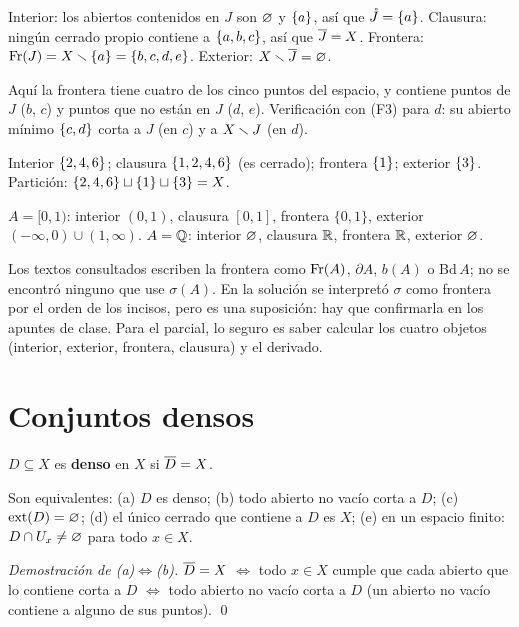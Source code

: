 \begin{ejemplo}[Ejemplo: $J=\s{a,b,c}$ en $\tau_1$ (Parte I, incisos g y h)]
Interior: los abiertos contenidos en $J$ son $\varnothing$ y $\{a\}$, así que $\mathring{J}=\{a\}$. Clausura: ningún cerrado
propio contiene a $\{a,b,c\}$, así que $\overline{J}=X$. Frontera: $\operatorname{Fr}(J)=X\smallsetminus\{a\}=\{b,c,d,e\}$. Exterior:
$X\smallsetminus\overline{J}=\varnothing$.

Aquí la frontera tiene cuatro de los cinco puntos del espacio, y contiene puntos de $J$ ($b$, $c$) y puntos que no
están en $J$ ($d$, $e$). Verificación con (F3) para $d$: su abierto mínimo $\{c,d\}$ corta a $J$ (en $c$) y a
$X\smallsetminus J$ (en $d$).
\end{ejemplo}
\begin{ejemplo}[Ejemplo: $L\cup M=\s{1,2,4,6}$ en $\tau_2$ (Parte II, inciso g)]
Interior $\{2,4,6\}$; clausura $\{1,2,4,6\}$ (es cerrado); frontera $\{1\}$; exterior $\{3\}$. Partición:
$\{2,4,6\}\sqcup\{1\}\sqcup\{3\}=X$.
\end{ejemplo}
\begin{ejemplo}[Ejemplos en $\R$]
$A=[0,1)$: interior $(0,1)$, clausura $[0,1]$, frontera $\{0,1\}$, exterior $(-\infty,0)\cup(1,\infty)$.\quad
$A=\mathbb{Q}$: interior $\varnothing$, clausura $\R$, frontera $\R$, exterior $\varnothing$.
\end{ejemplo}

\begin{ojo}
Los textos consultados escriben la frontera como $\operatorname{Fr}(A)$, $\partial A$, $b(A)$ o $\mathrm{Bd}\,A$; no se encontró
ninguno que use $\sigma(A)$. En la solución se interpretó $\sigma$ como frontera por el orden de los incisos, pero es
una suposición: hay que confirmarla en los apuntes de clase. Para el parcial, lo seguro es saber calcular los cuatro
objetos (interior, exterior, frontera, clausura) y el derivado.
\end{ojo}

\section{Conjuntos densos}
\begin{definicion}
$D\subseteq X$ es \textbf{denso} en $X$ si $\overline{D}=X$.
\end{definicion}
\begin{teorema}[Equivalencias]
Son equivalentes: (a) $D$ es denso; (b) todo abierto no vacío corta a $D$; (c) $\operatorname{ext}(D)=\varnothing$; (d) el único cerrado
que contiene a $D$ es $X$; (e) en un espacio finito: $D\cap U_x\neq\varnothing$ para todo $x\in X$.
\end{teorema}
\emph{Demostración de (a)$\iff$(b).} $\overline{D}=X$ $\iff$ todo $x\in X$ cumple que cada abierto que lo contiene corta a
$D$ $\iff$ todo abierto no vacío corta a $D$ (un abierto no vacío contiene a alguno de sus puntos). \qed

